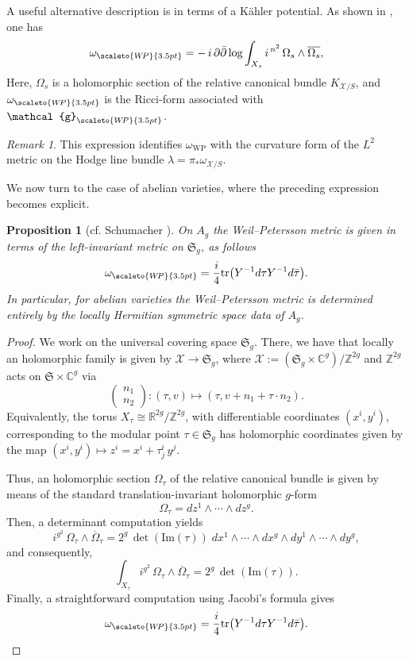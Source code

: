 \documentclass[11pt]{amsart}
\theoremstyle{plain}
\newtheorem{proposition}[theorem]{Proposition}
\theoremstyle{definition}
\theoremstyle{remark}
\newtheorem{remark}[theorem]{Remark}
\newcommand{\C}{{\mathbb C}}
\newcommand{\X}{{\mathcal X }}
\newcommand{\R}{\mathbb R}
\newcommand{\Z}{\mathbb{Z}}
\newcommand{\fS}{\mathfrak{S}}
\renewcommand{\log}{\mathrm{log}}
\newcommand{\im}{\mathrm{Im}}
\newcommand{\g}{\mathcal{g}}
\newcommand{\WP}{\scaleto{W\!P}{3.5pt}}
\begin{document}
A useful alternative description is in terms of a K\"ahler potential. As shown in \cite{Tian87}, one has 
\[
\omega_{\scaleto{W\!P}{3.5pt}}
=-\,i\,\partial\bar{\partial}\,
\log \int_{X_s} i^{\,n^2}\,\Omega_s\wedge \overline{\Omega_s},
\]
Here, $\Omega_s$ is a holomorphic section of the relative canonical bundle $K_{\X/S}$, and $\omega_{\scaleto{W\!P}{3.5pt}}$ is the Ricci-form associated with $\g_{\WP}$.

\begin{remark}
This expression identifies $\omega_{\mathrm{WP}}$ with the curvature form of the $L^2$ metric on the Hodge line bundle $\lambda=\pi_*\omega_{\X/S}$.   \end{remark}

We now turn to the case of abelian varieties, where the preceding expression becomes explicit.

\begin{proposition}[cf. Schumacher \cite{SCH85}]
On $A_g$ the Weil--Petersson metric is given in terms of the left-invariant metric on $\fS_g$, as follows
\begin{equation}
    \label{eq:wp.metric}
    \omega_{\scaleto{W\!P}{3.5pt}}=\frac{i}{4}\mathrm{tr}\big(Y^{-1}d\tau Y^{-1}d\bar\tau \big).
\end{equation}
In particular, for abelian varieties the Weil--Petersson metric is determined entirely by the locally Hermitian
symmetric space data of $A_g$.
\end{proposition}
\begin{proof}
    We work on the universal covering space $\fS_g$. There, we have that locally an holomorphic family is given by $\X\to \fS_g$, where $\X:=(\fS_g\times \C^g)/\Z^{2g}$ and $\Z^{2g}$ acts on $\fS\times \C^g$ via 
    \[
    \begin{pmatrix}
        n_1\\
        n_2
    \end{pmatrix}: (\tau,v)\mapsto(\tau, v+ n_1 + \tau\cdot n_2 ). 
    \]
    Equivalently, the torus $X_\tau \cong\R^{2g}/\Z^{2g}$, with differentiable coordinates $(x^i,y^i)$, corresponding to the modular point $\tau\in \fS_g$ has holomorphic coordinates given by the map $(x^i,y^i)\mapsto z^i=x^i + \tau^i_j\,y^j$. 
    
    Thus, an holomorphic section $\Omega_\tau$ of the relative canonical bundle is given by means of the standard translation-invariant holomorphic $g$-form
    \[
    \Omega_\tau=dz^1\wedge\cdots\wedge dz^g.
    \]
    Then, a determinant computation yields
    \[
    i^{g^2}\,\Omega_\tau\wedge\overline\Omega_\tau=2^g\,\det(\im(\tau))\; dx^1\wedge\cdots\wedge dx^g\wedge dy^1\wedge\cdots\wedge dy^g,
    \]
    and consequently,
    \[
    \int_{X_\tau} i^{g^2}\,\Omega_\tau\wedge\overline\Omega_\tau=2^g\,\det(\im(\tau)).
    \]
    Finally, a straightforward computation using Jacobi's formula gives
    \[
    \omega_{\scaleto{W\!P}{3.5pt}}=\frac{i}{4}\mathrm{tr}\big(Y^{-1}d\tau Y^{-1}d\bar\tau \big).
    \]\end{proof}
\end{document}
